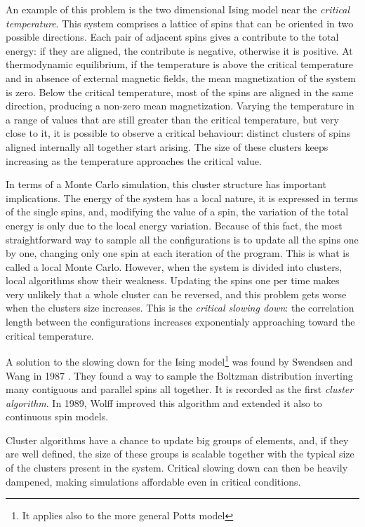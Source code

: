 An example of this problem is the two dimensional Ising model near the \emph{critical temperature}.
This system comprises a lattice of spins that can be oriented in two possible directions.
Each pair of adjacent spins gives a contribute to the total energy: if they are aligned, the contribute is negative, otherwise it is positive.
At thermodynamic equilibrium, if the temperature is above the critical temperature and in absence of external magnetic fields, the mean magnetization of the system is zero.
Below the critical temperature, most of the spins are aligned in the same direction, producing a non-zero mean magnetization.
Varying the temperature in a range of values that are still greater than the critical temperature, but very close to it,
it is possible to observe a critical behaviour: distinct clusters of spins aligned internally all together start arising.
The size of these clusters keeps increasing as the temperature approaches the critical value.

In terms of a Monte Carlo simulation, this cluster structure has important implications.
The energy of the system has a local nature,
\ie it is expressed in terms of the single spins, and, modifying the value of a spin,
the variation of the total energy is only due to the local energy variation.
Because of this fact, the most straightforward way to sample all the configurations is to update all the spins one by one,
changing only one spin at each iteration of the program. This is what is called a local Monte Carlo.
However, when the system is divided into clusters, local algorithms show their weakness.
Updating the spins one per time makes very unlikely that a whole cluster can be reversed,
and this problem gets worse when the clusters size increases.
This is the \emph{critical slowing down}: the correlation length between the configurations increases exponentialy approaching toward the critical temperature.

A solution to the slowing down for the Ising model\footnote{It applies also to the more general Potts model} was found by Swendsen and Wang in 1987 \cite{swendsen-wang:1987}.
They found a way to sample the Boltzman distribution inverting many contiguous and parallel spins all together.
It is recorded as the first \emph{cluster algorithm}.
In 1989, Wolff \cite{wolff:1989} improved this algorithm and extended it also to continuous spin models.

Cluster algorithms have a chance to update big groups of elements, and, if they are well defined,
the size of these groups is scalable together with the typical size of the clusters present in the system.
Critical slowing down can then be heavily dampened, making simulations affordable even in critical conditions.

